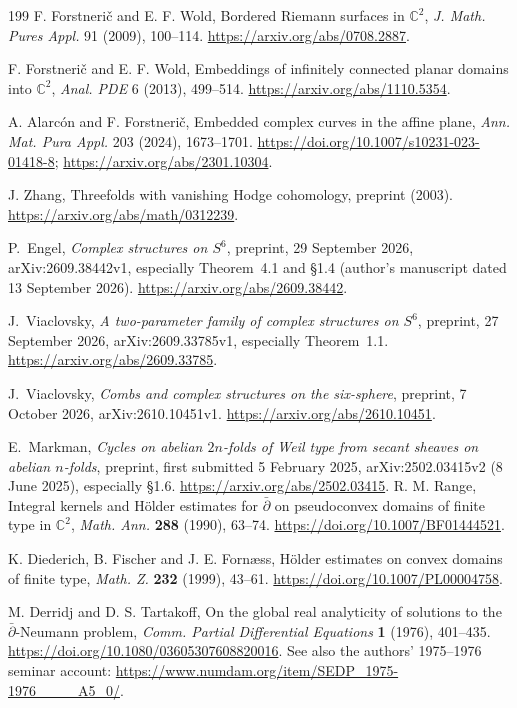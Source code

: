 \documentclass[11pt,reqno]{amsart}
\theoremstyle{definition}
\theoremstyle{remark}
\begin{document}
\begin{thebibliography}{199}
 F. Forstneri\v c and E. F. Wold, Bordered Riemann surfaces in $\mathbb C^2$, \emph{J. Math. Pures Appl.} 91 (2009), 100--114. \url{https://arxiv.org/abs/0708.2887}.

 F. Forstneri\v c and E. F. Wold, Embeddings of infinitely connected planar domains into $\mathbb C^2$, \emph{Anal. PDE} 6 (2013), 499--514. \url{https://arxiv.org/abs/1110.5354}.

 A. Alarc\'on and F. Forstneri\v c, Embedded complex curves in the affine plane, \emph{Ann. Mat. Pura Appl.} 203 (2024), 1673--1701. \url{https://doi.org/10.1007/s10231-023-01418-8}; \url{https://arxiv.org/abs/2301.10304}.

 J. Zhang, Threefolds with vanishing Hodge cohomology, preprint (2003). \url{https://arxiv.org/abs/math/0312239}.

 P.~Engel, \emph{Complex structures on $S^6$}, preprint, 29 September 2026, arXiv:2609.38442v1, especially Theorem~4.1 and \S1.4 (author's manuscript dated 13 September 2026). \url{https://arxiv.org/abs/2609.38442}.

 J.~Viaclovsky, \emph{A two-parameter family of complex structures on $S^6$}, preprint, 27 September 2026, arXiv:2609.33785v1, especially Theorem~1.1. \url{https://arxiv.org/abs/2609.33785}.

 J.~Viaclovsky, \emph{Combs and complex structures on the six-sphere}, preprint, 7 October 2026, arXiv:2610.10451v1. \url{https://arxiv.org/abs/2610.10451}.

 E.~Markman, \emph{Cycles on abelian $2n$-folds of Weil type from secant sheaves on abelian $n$-folds}, preprint, first submitted 5 February 2025, arXiv:2502.03415v2 (8 June 2025), especially \S1.6. \url{https://arxiv.org/abs/2502.03415}.
 R. M. Range, Integral kernels and H\"older estimates for $\bar\partial$ on pseudoconvex domains of finite type in $\mathbb C^2$, \emph{Math. Ann.} \textbf{288} (1990), 63--74. \url{https://doi.org/10.1007/BF01444521}.

 K. Diederich, B. Fischer and J. E. Forn\ae ss, H\"older estimates on convex domains of finite type, \emph{Math. Z.} \textbf{232} (1999), 43--61. \url{https://doi.org/10.1007/PL00004758}.

 M. Derridj and D. S. Tartakoff, On the global real analyticity of solutions to the $\bar\partial$-Neumann problem, \emph{Comm. Partial Differential Equations} \textbf{1} (1976), 401--435. \url{https://doi.org/10.1080/03605307608820016}. See also the authors' 1975--1976 seminar account: \url{https://www.numdam.org/item/SEDP_1975-1976____A5_0/}.


\end{thebibliography}
\end{document}
